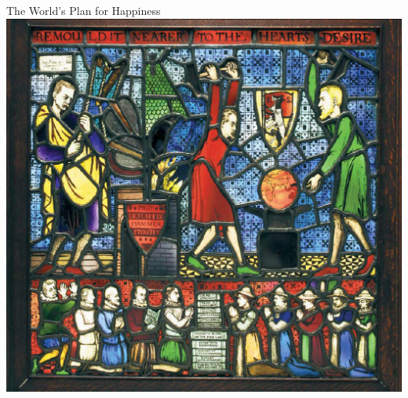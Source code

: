 \begin{frame}{The World's Plan for Happiness}
    \centering
    \includegraphics[height=.9\textheight]{img/remold-it.jpg} \\
\end{frame}


